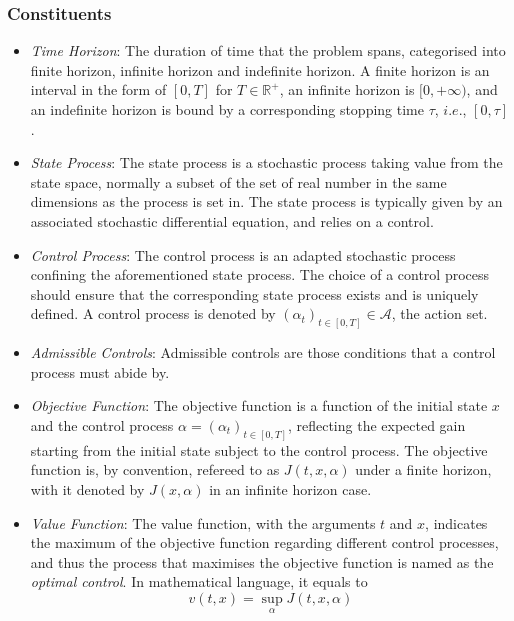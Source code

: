\documentclass[11pt,twoside]{article}
\numberwithin{Theorem}{section}
\numberwithin{Definition}{section}
\numberwithin{Lemma}{section}
\numberwithin{Algorithm}{section}
\numberwithin{equation}{section}
\begin{document}
\subsubsection{Constituents}
\begin{itemize}
    \item \emph{Time Horizon}: The duration of time that the problem spans, categorised into finite horizon, infinite horizon and indefinite horizon. A finite horizon is an interval in the form of $[0,T]$ for $T \in \mathbb{R}^+$, an infinite horizon is $[0,+\infty)$, and an indefinite horizon is bound by a corresponding stopping time $\tau$, $i.e.$, $[0,\tau]$.
    \item \emph{State Process}: The state process is a stochastic process taking value from the state space, normally a subset of the set of real number in the same dimensions as the process is set in. The state process is typically given by an associated stochastic differential equation, and relies on a control.
    \item  \emph{Control Process}: The control process is an adapted stochastic process confining the aforementioned state process. The choice of a control process should ensure that the corresponding state process exists and is uniquely defined. A control process is denoted by $\left(\alpha_t\right)_{t\in[0,T]}\in\mathcal{A}$, the action set.
    \item  \emph{Admissible Controls}: Admissible controls are those conditions that a control process must abide by.
    \item  \emph{Objective Function}: The objective function is a function of the initial state $x$ and the control process $\alpha=\left(\alpha_t\right)_{t\in[0,T]}$, reflecting the expected gain starting from the initial state subject to the control process. The objective function is, by convention, refereed to as $J(t,x,\alpha)$ under a finite horizon, with it denoted by $J(x,\alpha)$ in an infinite horizon case.
    \item  \emph{Value Function}: The value function, with the arguments $t$ and $x$, indicates the maximum of the objective function regarding different control processes, and thus the process that maximises the objective function is named as the \emph{optimal control}. In mathematical language, it equals to
    \begin{equation*}
        v(t,x)=\sup_{\alpha} J(t,x,\alpha)
    \end{equation*}
\end{itemize}
\end{document}
